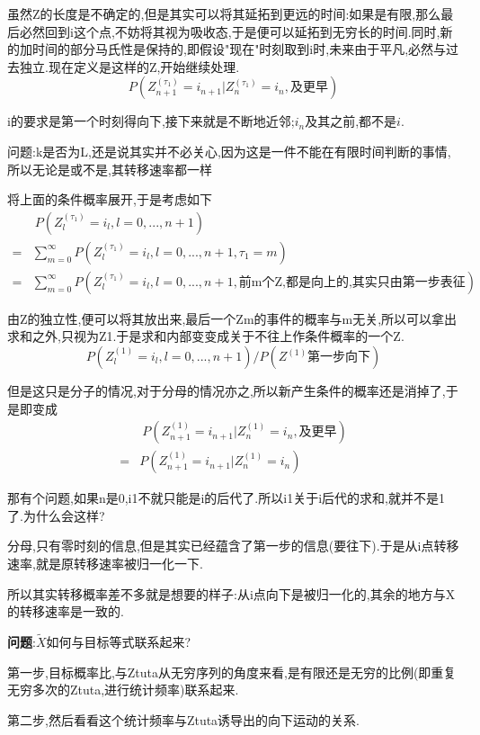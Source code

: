 \begin{pf}[temp孙振尧证明]
					虽然Z的长度是不确定的,但是其实可以将其延拓到更远的时间:如果是有限,那么最后必然回到i这个点,不妨将其视为吸收态,于是便可以延拓到无穷长的时间.同时,新的加时间的部分马氏性是保持的,即假设"现在"时刻取到i时,未来由于平凡,必然与过去独立.现在定义是这样的Z,开始继续处理.
					$$P(Z^{(\tau_1)}_{n+1} = i_{n+1} | Z^{(\tau_1)}_n = i_n, \mbox{及更早})$$
				
					i的要求是第一个时刻得向下,接下来就是不断地近邻;$i_n$及其之前,都不是$i$.
				
					问题:k是否为L,还是说其实并不必关心,因为这是一件不能在有限时间判断的事情,所以无论是或不是,其转移速率都一样
				
					将上面的条件概率展开,于是考虑如下
					\begin{align*}
						&\ P(Z^{(\tau_1)}_{l} = i_{l}, l = 0,...,n+1) \\
						=& \sum_{m=0}^\infty P(Z^{(\tau_1)}_{l} = i_{l}, l = 0,...,n+1,\tau_1 = m) \\
						=& \sum_{m=0}^\infty P(Z^{(\tau_1)}_{l} = i_{l}, l = 0,...,n+1,\mbox{前m个Z,都是向上的,其实只由第一步表征}) 
					\end{align*}

					由Z的独立性,便可以将其放出来,最后一个Zm的事件的概率与m无关,所以可以拿出求和之外,只视为Z1.于是求和内部变变成关于不往上作条件概率的一个Z.
					$$P(Z^{(1)}_{l} = i_{l}, l = 0,...,n+1)/P(Z^{(1)}\mbox{第一步向下})$$

					但是这只是分子的情况,对于分母的情况亦之,所以新产生条件的概率还是消掉了,于是即变成
					\begin{align*}
						&\ P(Z^{(1)}_{n+1} = i_{n+1} | Z^{(1)}_n = i_n, \mbox{及更早}) \\
						=& P(Z^{(1)}_{n+1} = i_{n+1} | Z^{(1)}_n = i_n)
					\end{align*}

					那有个问题,如果n是0,i1不就只能是i的后代了.所以i1关于i后代的求和,就并不是1了.为什么会这样?

					分母,只有零时刻的信息,但是其实已经蕴含了第一步的信息(要往下).于是从i点转移速率,就是原转移速率被归一化一下.

					所以其实转移概率差不多就是想要的样子:从i点向下是被归一化的,其余的地方与X的转移速率是一致的.
				
				\qquad \textbf{问题}:$\tilde{X}$如何与目标等式联系起来?

					第一步,目标概率比,与Ztuta从无穷序列的角度来看,是有限还是无穷的比例(即重复无穷多次的Ztuta,进行统计频率)联系起来.

					第二步,然后看看这个统计频率与Ztuta诱导出的向下运动的关系.


\end{pf}
